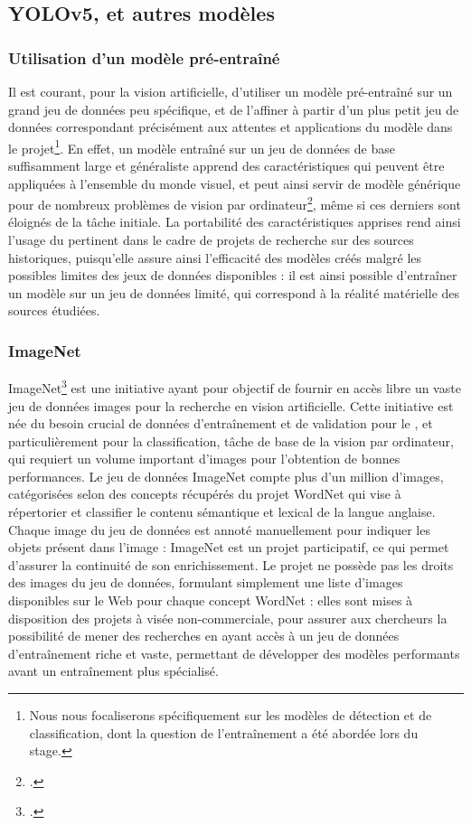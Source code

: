 
\subsection{YOLOv5, \docex et autres modèles}
    \subsubsection{Utilisation d'un modèle pré-entraîné}
	Il est courant, pour la vision artificielle, d'utiliser un modèle pré-entraîné sur un grand jeu de données peu spécifique, et de l'affiner à partir d'un plus petit jeu de données correspondant précisément aux attentes et applications du modèle dans le projet\footnote{Nous nous focaliserons spécifiquement sur les modèles de détection et de classification, dont la question de l'entraînement a été abordée lors du stage.}. En effet, un modèle entraîné sur un jeu de données de base suffisamment large et généraliste apprend des caractéristiques qui peuvent être appliquées à l'ensemble du monde visuel, et peut ainsi servir de modèle générique pour de nombreux problèmes de vision par ordinateur\footcite{cholletApprentissageProfondAvec2020a}, même si ces derniers sont éloignés de la tâche initiale. La portabilité des caractéristiques apprises rend ainsi l'usage du \dl pertinent dans le cadre de projets de recherche sur des sources historiques, puisqu'elle assure ainsi l'efficacité des modèles créés malgré les possibles limites des jeux de données disponibles : il est ainsi possible d'entraîner un modèle sur un jeu de données limité, qui correspond à la réalité matérielle des sources étudiées. 
	
	\subsubsection{ImageNet} 
	ImageNet\footcite{ImageNet} est une initiative ayant pour objectif de fournir en accès libre un vaste jeu de données images pour la recherche en vision artificielle. Cette initiative est née du besoin crucial de données d'entraînement et de validation pour le \ml, et particulièrement pour la classification, tâche de base de la vision par ordinateur, qui requiert un volume important d'images pour l'obtention de bonnes performances. Le jeu de données ImageNet compte plus d'un million d'images, catégorisées selon des concepts récupérés du projet WordNet qui vise à répertorier et classifier le contenu sémantique et lexical de la langue anglaise. Chaque image du jeu de données est annoté manuellement pour indiquer les objets présent dans l'image : ImageNet est un projet participatif, ce qui permet d'assurer la continuité de son enrichissement. Le projet ne possède pas les droits des images du jeu de données, formulant simplement une liste d'images disponibles sur le Web pour chaque concept WordNet : elles sont mises à disposition des projets à visée non-commerciale, pour assurer aux chercheurs la possibilité de mener des recherches en ayant accès à un jeu de données d'entraînement riche et vaste, permettant de développer des modèles performants avant un entraînement plus spécialisé.
    
